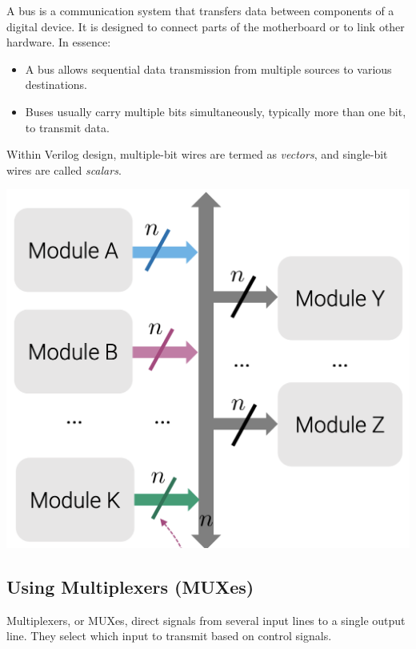 \documentclass[12pt,openany]{book}
\begin{document}
					  \begin{minipage}{0.48\textwidth}
						  A bus is a communication system that transfers data between components of a digital device. It is designed to connect parts of the motherboard or to link other hardware. In essence:
						  \begin{itemize}
							  \item A bus allows sequential data transmission from multiple sources to various destinations.
							  \item Buses usually carry multiple bits simultaneously, typically more than one bit, to transmit data.
						  \end{itemize}
						  Within Verilog design, multiple-bit wires are termed as \textit{vectors}, and single-bit wires are called \textit{scalars}.
					  \end{minipage}
					  \hfill
					  \begin{minipage}{0.48\textwidth}
						  \centering
						  \includegraphics[width=\textwidth]{circuits/11.1.png} %
					  \end{minipage}
										  
					  \subsection{Using Multiplexers (MUXes)}
					  Multiplexers, or MUXes, direct signals from several input lines to a single output line. They select which input to transmit based on control signals.
\end{document}

